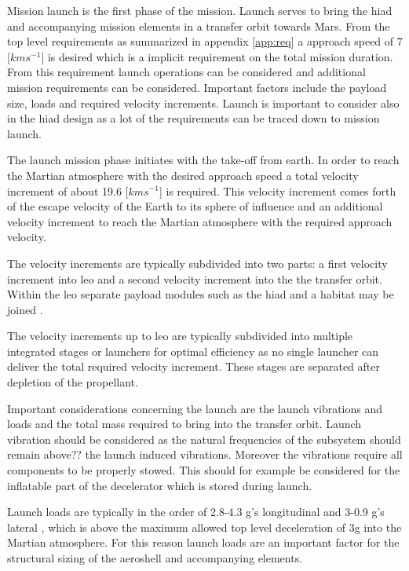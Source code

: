 Mission launch is the first phase of the mission. Launch serves to bring the \gls{hiad} and accompanying mission elements in a transfer orbit towards Mars. From the top level requirements as summarized in appendix \ref{app:req} a approach speed of 7 [$kms^{-1}$] is desired which is a implicit requirement on the total mission duration.
From this requirement launch operations can be considered and additional mission requirements can be considered. Important factors include the payload size, loads and required velocity increments. Launch is important to consider also in the \gls{hiad} design as a lot of the requirements can be traced down to mission launch.

The launch mission phase initiates with the take-off from earth. In order to reach the Martian atmosphere with the desired approach speed a total velocity increment of about 19.6 [$kms^{-1}$] is required. This velocity increment comes forth of the escape velocity of the Earth to its sphere of influence and an additional velocity increment to reach the Martian atmosphere with the required approach velocity.

The velocity increments are typically subdivided into two parts: a first velocity increment into \gls{leo} and a second velocity increment into the the transfer orbit. Within the \gls{leo} separate payload modules such as the \gls{hiad} and a habitat may be joined \cite{George2009}.

The velocity increments up to \gls{leo} are typically subdivided into multiple integrated stages or launchers for optimal efficiency as no single launcher can deliver the total required velocity increment. These stages are separated after depletion of the propellant.

Important considerations concerning the launch are the launch vibrations and loads and the total mass required to bring into the transfer orbit. Launch vibration should be considered as the natural frequencies of the subsystem should remain above?? the launch induced vibrations. Moreover the vibrations require all components to be properly stowed. This should for example be considered for the inflatable part of the decelerator which is stored during launch.

Launch loads are typically in the order of 2.8-4.3 g's longitudinal and 3-0.9 g's lateral \cite{Wertz2011}, which is above the maximum allowed top level deceleration of 3g into the Martian atmosphere. For this reason launch loads are an important factor for the structural sizing of the aeroshell and accompanying elements. 

